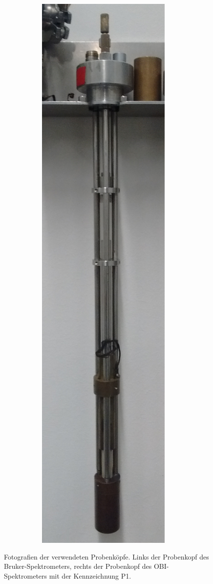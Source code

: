 \begin{figure}
\begin{subfigure}{.10\textwidth}
		\includegraphics[width=0.95\textwidth]{graphics/probenkopf/probenkopf_p1.jpg}
		\caption{ }
		\label{fig:exp:probenkopf_obi}
	\end{subfigure}
	\caption{Fotografien der verwendeten Probenköpfe. Links der Probenkopf des Bruker-Spektrometers, rechts der Probenkopf des OBI-Spektrometers mit der Kennzeichnung P1.}
	\label{fig:exp:probenkoepfe}
\end{figure}



